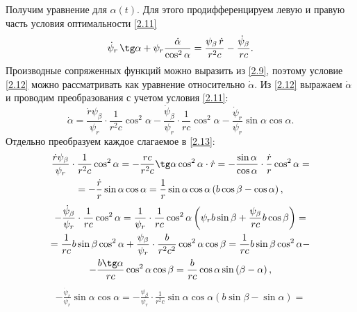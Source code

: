 \documentclass[a4paper,12pt, openany]{book}
\theoremstyle{plain} %
\theoremstyle{definition} %
\theoremstyle{remark} %
\numberwithin{equation}{chapter}
\begin{document}
{Получим уравнение для $\alpha(t)$. Для этого продифференцируем левую и правую часть условия оптимальности \eqref{2.11}
\begin{equation}\label{2.12}
\dot \psi _r \,\tg\alpha  + \psi _r \frac{{\dot \alpha }}{{\cos ^2 \alpha }} = \frac{{\psi _\beta  \,\dot r}}{{r^2 c}} - \frac{{\dot \psi _\beta  }}{{rc}}.
\end{equation}
Производные сопряженных функций можно выразить из \eqref{2.9}, поэтому условие \eqref{2.12} можно рассматривать как уравнение относительно $\dot{\alpha}$. Из \eqref{2.12} выражаем $\dot{\alpha}$ и проводим преобразования с учетом условия \eqref{2.11}:
\begin{equation}\label{2.13}
\dot \alpha  = \frac{{\dot r\psi _\beta  }}{{\psi _r }} \cdot \frac{1}{{r^2 c}}\cos ^2 \alpha  - \frac{{\dot \psi _\beta  }}{{\psi _r }} \cdot \frac{1}{{rc}}\cos ^2 \alpha  - \frac{{\dot \psi _r }}{{\psi _r }}\sin \alpha \cos \alpha.
\end{equation}
Отдельно преобразуем каждое слагаемое в \eqref{2.13}:
\begin{multline*}
\frac{{\dot r\psi _\beta  }}{{\psi _r }} \cdot \frac{1}{{r^2 c}}\cos ^2 \alpha  =  - \frac{{rc}}{{r^2 c}}\tg\alpha \cos ^2 \alpha \cdot \dot r =  - \frac{{\sin \alpha }}{{\cos \alpha }} \cdot \frac{{\dot r}}{r}\cos ^2 \alpha  =  \\
 =  - \frac{{\dot r}}{r}\sin \alpha \cos \alpha  = \frac{1}{r}\sin \alpha \cos \alpha \left( {b\cos \beta  - \cos \alpha } \right), 
\end{multline*}
\begin{multline*}
 - \frac{{\dot \psi _\beta  }}{{\psi _r }} \cdot \frac{1}{{rc}}\cos ^2 \alpha  = \frac{1}{{\psi _r }} \cdot \frac{1}{{rc}}\cos ^2 \alpha \left( {\psi _r b\sin \beta  + \frac{{\psi _\beta  }}{{rc}}b\cos \beta } \right) =  \\
 = \frac{1}{{rc}}b\sin \beta \cos ^2 \alpha  + \frac{{\psi _\beta  }}{{\psi _r }} \cdot \frac{b}{{r^2 c^2 }}\cos ^2 \alpha \cos \beta  = \frac{1}{{rc}}b\sin \beta \cos ^2 \alpha  -  \\
 - \frac{{b\tg\alpha }}{{rc}}\cos ^2 \alpha \cos \beta  = \frac{b}{{rc}}\cos \alpha \sin \left( {\beta  - \alpha } \right),
\end{multline*}
\begin{multline*}
 - \frac{{\dot \psi _r }}{{\psi _r }}\sin \alpha \cos \alpha  =  - \frac{{\psi _\beta  }}{{\psi _r }} \cdot \frac{1}{{r^2 c}}\sin \alpha \cos \alpha \left( {b\sin \beta  - \sin \alpha } \right) = \\

\end{multline*}}
\end{document}

